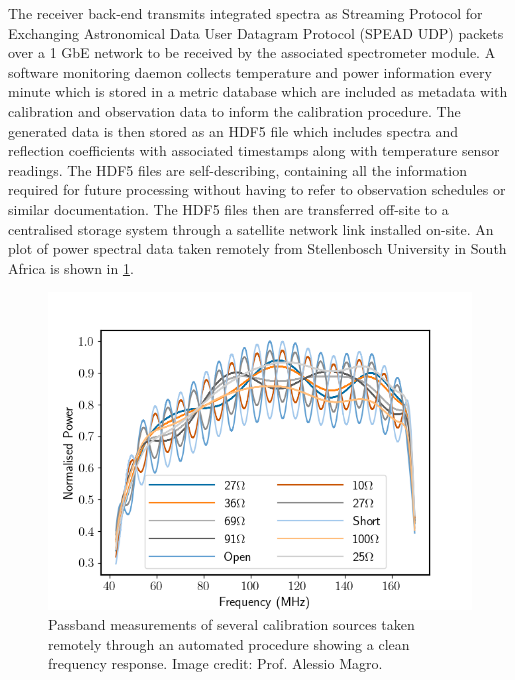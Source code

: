 The receiver back-end transmits integrated spectra as Streaming Protocol for Exchanging Astronomical Data User Datagram Protocol (SPEAD UDP) packets over a 1 GbE network to be received by the associated spectrometer module. A software monitoring daemon collects temperature and power information every minute which is stored in a metric database which are included as metadata with calibration and observation data to inform the calibration procedure. The generated data is then stored as an HDF5 file which includes spectra and reflection coefficients with associated timestamps along with temperature sensor readings. The HDF5 files are self-describing, containing all the information required for future processing without having to refer to observation schedules or similar documentation. The HDF5 files then are transferred off-site to a centralised storage system through a satellite network link installed on-site. An plot of power spectral data taken remotely from Stellenbosch University in South Africa is shown in \cref{fig:remote_data}.
\begin{figure}
    \centering
    \includegraphics[scale=0.6]{remote_data}
    \caption{Passband measurements of several calibration sources taken remotely through an automated procedure showing a clean frequency response. Image credit: Prof. Alessio Magro.}
    \label{fig:remote_data}
\end{figure}


